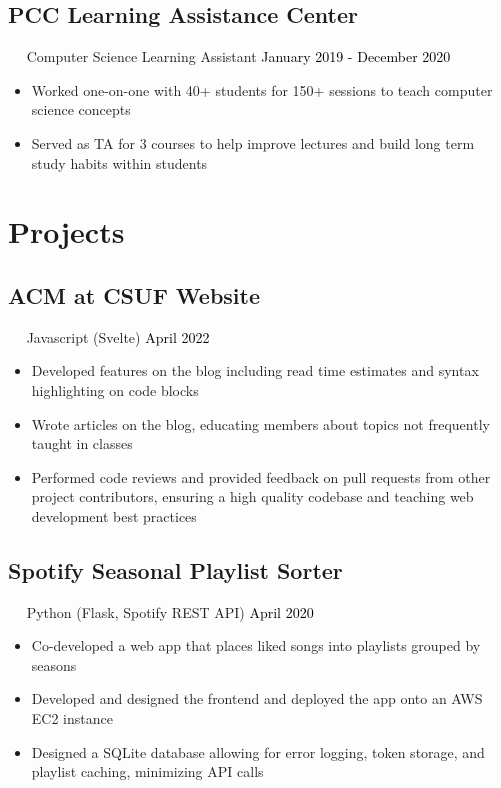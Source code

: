 \documentclass{article}
\newcommand{\resumesection}[3]{
    \subsection*{#1}
    \ 
    \ 
    \small
    \textcolor{csufgrey}{#2}
    \normalsize
    \hfill
    \textcolor{black}{#3}
    \normalsize
}
\begin{document}
\resumesection{PCC Learning Assistance Center}{Computer Science Learning Assistant}{January 2019 - December 2020}
\begin{itemize}
    \item Worked one-on-one with 40+ students for 150+ sessions to teach computer science concepts
    \item Served as TA for 3 courses to help improve lectures and build long term study habits within students
\end{itemize}
\section*{Projects}
\resumesection{ACM at CSUF Website}{Javascript (Svelte)}{April 2022}
\begin{itemize}
    \item Developed features on the blog including read time estimates and syntax highlighting on code blocks
    \item Wrote articles on the blog, educating members about topics not frequently taught in classes
    \item Performed code reviews and provided feedback on pull requests from other project contributors, ensuring a high quality codebase and teaching web development best practices
\end{itemize}
\resumesection{Spotify Seasonal Playlist Sorter}{Python (Flask, Spotify REST API)}{April 2020}
\begin{itemize}
    \item Co-developed a web app that places liked songs into playlists grouped by seasons
    \item Developed and designed the frontend and deployed the app onto an AWS EC2 instance
    \item Designed a SQLite database allowing for error logging, token storage, and playlist caching, minimizing API calls
\end{itemize}
\end{document}
